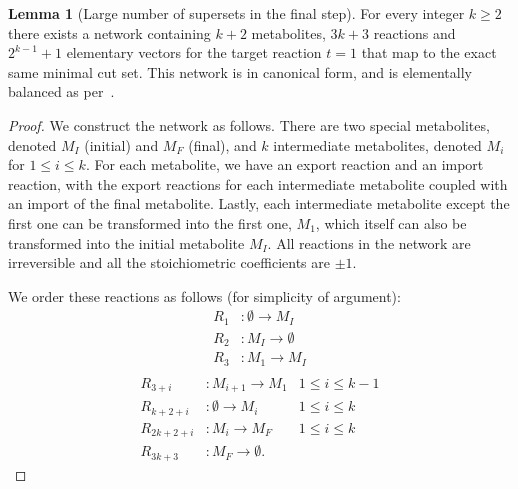 \documentclass{bioinfo}
\theoremstyle{plain}
\theoremstyle{definition}
\newtheorem{lemma}{Lemma} %
\begin{document}
\begin{lemma}[Large number of supersets in the final step] \label{blowup} For every integer $k \geq 2$ there exists a network containing $k+2$ metabolites, $3k+3$ reactions and $2^{k-1}+1$ elementary vectors for the target reaction $t = 1$ that map to the exact same minimal cut set. This network is in canonical form, and is elementally balanced as per~\cite{MFL}.
\end{lemma}
\begin{proof}%
We construct the network as follows. There are two special metabolites, denoted $M_I$ (initial) and $M_F$ (final), and $k$ intermediate metabolites, denoted $M_i$ for $1 \leq i \leq k$. For each metabolite, we have an export reaction and an import reaction, with the export reactions for each intermediate metabolite coupled with an import of the final metabolite. Lastly, each intermediate metabolite except the first one can be transformed into the first one, $M_1$, which itself can also be transformed into the initial metabolite $M_I$. All reactions in the network are irreversible and all the stoichiometric coefficients are $\pm 1$.

We order these reactions as follows (for simplicity of argument):
\begin{align*}
R_1 & : \emptyset \rightarrow M_I \\
R_2 & : M_I \rightarrow \emptyset \\
R_3 & : M_1 \rightarrow M_I \\
\end{align*}
\begin{align*}
R_{3+i} & : M_{i+1} \rightarrow M_1 & 1 \leq i \leq k-1\\
R_{k+2+i} & : \emptyset \rightarrow M_{i} & 1 \leq i \leq k\\
R_{2k+2+i} & : M_{i} \rightarrow M_{F} & 1 \leq i \leq k\\
R_{3k+3} & : M_{F} \rightarrow \emptyset.
\end{align*}


\end{proof}
\end{document}
